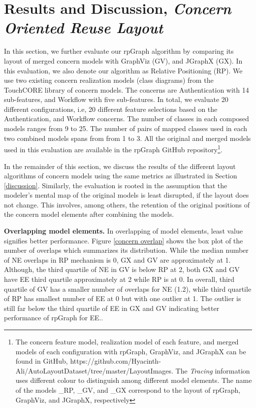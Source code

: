 \section{Results and Discussion, \textit{Concern Oriented Reuse Layout}}\label{concern discussion}
In this section, we further evaluate our rpGraph algorithm by comparing its layout of merged concern models with GraphViz (GV), and JGraphX (GX). In this evaluation, we also denote our algorithm as Relative Positioning (RP). We use two existing concern realization models (class diagrams) from the TouchCORE library of concern models. The concerns are Authentication with 14 sub-features, and Workflow with five sub-features. In total, we evaluate 20 different configurations, i.e, 20 different feature selections based on the Authentication, and Workflow concerns.  The number of classes in each composed models ranges from 9 to 25. The number of pairs of mapped classes used in each two combined models spans from from 1 to 3. All the original and merged models used in this evaluation are available in the rpGraph GitHub repository\footnote{The concern feature model, realization model of each feature, and merged models of each configuration with rpGraph, GraphViz, and JGraphX can be found in GitHub, https://github.com/Hyacinth-Ali/AutoLayoutDataset/tree/master/LayoutImages. The \textit{Tracing} information uses different colour to distinguish among different model elements. The name of the models \_RP, \_GV, and \_GX correspond to the layout of rpGraph, GraphViz, and JGraphX, respectively}. 

 In the remainder of this section, we discuss the results of the different layout algorithms of concern models using the same metrics as illustrated in Section \ref{discussion}. Similarly, the evaluation is rooted in the assumption that the modeler's mental map of the original models is least disrupted, if the layout does not change. This involves, among others, the retention of the original positions of the concern model elements after combining the models. 

\textbf{Overlapping model elements.} In overlapping of model elements, least value signifies better performance. Figure \ref{concern overlap} shows the box plot of the number of overlaps which summarizes its distribution.  While the median number of NE overlaps in RP mechanism is 0, GX and GV are approximately at 1. Although, the third quartile of NE in GV is below RP at 2, both GX and GV have EE third quartile approximately at 2 while RP is at 0.  In overall, third quartile of GV has a smaller number of overlaps for NE (1.2), while third quartile of RP has smallest number of EE at 0 but with one outlier at 1. The outlier is still far below the third quartile of EE in GX and GV indicating better performance of rpGraph for EE..


